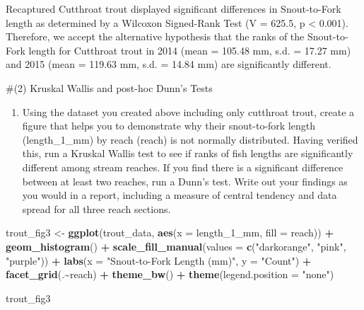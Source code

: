 \documentclass[
]{article}
\newenvironment{Shaded}{\begin{snugshade}}{\end{snugshade}}
\newcommand{\AttributeTok}[1]{\textcolor[rgb]{0.13,0.29,0.53}{#1}}
\newcommand{\FunctionTok}[1]{\textcolor[rgb]{0.13,0.29,0.53}{\textbf{#1}}}
\newcommand{\NormalTok}[1]{#1}
\newcommand{\OtherTok}[1]{\textcolor[rgb]{0.56,0.35,0.01}{#1}}
\newcommand{\SpecialCharTok}[1]{\textcolor[rgb]{0.81,0.36,0.00}{\textbf{#1}}}
\newcommand{\StringTok}[1]{\textcolor[rgb]{0.31,0.60,0.02}{#1}}
\providecommand{\tightlist}{%
  \setlength{\itemsep}{0pt}\setlength{\parskip}{0pt}}
\begin{document}
Recaptured Cutthroat trout displayed significant diﬀerences in
Snout-to-Fork length as determined by a Wilcoxon Signed-Rank Test (V =
625.5, p \textless{} 0.001). Therefore, we accept the alternative
hypothesis that the ranks of the Snout-to-Fork length for Cutthroat
trout in 2014 (mean = 105.48 mm, s.d. = 17.27 mm) and 2015 (mean =
119.63 mm, s.d. = 14.84 mm) are significantly different.

\#(2) Kruskal Wallis and post-hoc Dunn's Tests

\begin{enumerate}
\def\labelenumi{\alph{enumi}.}
\tightlist
\item
  Using the dataset you created above including only cutthroat trout,
  create a figure that helps you to demonstrate why their snout-to-fork
  length (length\_1\_mm) by reach (reach) is not normally distributed.
  Having verified this, run a Kruskal Wallis test to see if ranks of
  fish lengths are significantly diﬀerent among stream reaches. If you
  find there is a significant diﬀerence between at least two reaches,
  run a Dunn's test. Write out your findings as you would in a report,
  including a measure of central tendency and data spread for all three
  reach sections.
\end{enumerate}

\begin{Shaded}
\begin{Highlighting}[]
\NormalTok{trout\_fig3 }\OtherTok{\textless{}{-}} \FunctionTok{ggplot}\NormalTok{(trout\_data, }\FunctionTok{aes}\NormalTok{(}\AttributeTok{x =}\NormalTok{ length\_1\_mm, }\AttributeTok{fill =}\NormalTok{ reach)) }\SpecialCharTok{+}
  \FunctionTok{geom\_histogram}\NormalTok{() }\SpecialCharTok{+}
  \FunctionTok{scale\_fill\_manual}\NormalTok{(}\AttributeTok{values =} \FunctionTok{c}\NormalTok{(}\StringTok{"darkorange"}\NormalTok{, }\StringTok{"pink"}\NormalTok{, }\StringTok{"purple"}\NormalTok{)) }\SpecialCharTok{+}
  \FunctionTok{labs}\NormalTok{(}\AttributeTok{x =} \StringTok{"Snout{-}to{-}Fork Length (mm)"}\NormalTok{, }\AttributeTok{y =} \StringTok{"Count"}\NormalTok{) }\SpecialCharTok{+}
  \FunctionTok{facet\_grid}\NormalTok{(.}\SpecialCharTok{\textasciitilde{}}\NormalTok{reach) }\SpecialCharTok{+}
  \FunctionTok{theme\_bw}\NormalTok{() }\SpecialCharTok{+}
  \FunctionTok{theme}\NormalTok{(}\AttributeTok{legend.position =} \StringTok{"none"}\NormalTok{)}

\NormalTok{trout\_fig3}
\end{Highlighting}
\end{Shaded}
\end{document}
